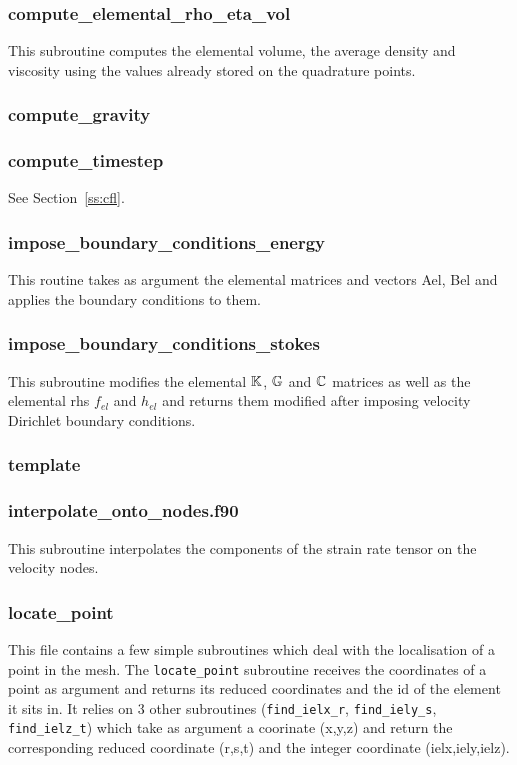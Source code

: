  \subsubsection{compute\_elemental\_rho\_eta\_vol}
 This subroutine computes the elemental volume, the average density and 
 viscosity using the values already stored on the quadrature points. 
 \subsubsection{compute\_gravity}

 \subsubsection{compute\_timestep}
 See Section~\ref{ss:cfl}.
 \subsubsection{impose\_boundary\_conditions\_energy}
 This routine takes as argument the elemental matrices and vectors Ael, Bel
 and applies the boundary conditions to them.
 \subsubsection{impose\_boundary\_conditions\_stokes}
 This subroutine modifies the elemental ${\mathbb{K}}$, ${\mathbb{G}}$ and ${\mathbb{C}}$ matrices as well as the 
 elemental rhs $f_{el}$ and $h_{el}$ and returns them modified after imposing
 velocity Dirichlet boundary conditions.
 \subsubsection{template}

 \subsubsection{interpolate\_onto\_nodes.f90}
 This subroutine interpolates the components of the strain rate tensor on the velocity nodes.
 \subsubsection{locate\_point}
 This file contains a few simple subroutines which deal with the localisation of a point 
 in the mesh. The {\tt locate\_point} subroutine receives the coordinates of a point as argument 
 and returns its reduced coordinates and the id of the element it sits in.
 It relies on 3 other subroutines ({\tt find\_ielx\_r}, {\tt find\_iely\_s}, {\tt find\_ielz\_t})
 which take as argument a coorinate (x,y,z) and return the corresponding reduced
 coordinate (r,s,t) and the integer coordinate (ielx,iely,ielz).
